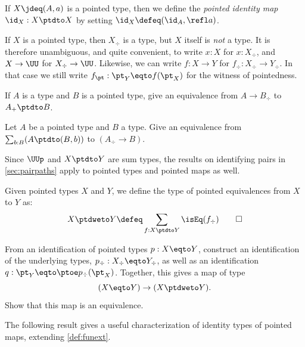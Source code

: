 \begin{definition}\label{def:pointedidentity}
  If $X \jdeq (A,a)$ is a pointed type, then we define the \emph{pointed identity map}
  $\id_X : X \ptdto X$ by setting $\id_X \defeq (\id_A, \refl a)$.
\end{definition}

\begin{remark}\label{rem:coerceawaypt}
If $X$ is a pointed type, then $X_\div $ is a type, but $X$ itself is
\emph{not} a type. It is therefore unambiguous, and quite convenient,
to write $x:X$ for $x:X_\div$, and $X\to\UU$ for $X_\div\to\UU$.
Likewise, we can write $f : X \to Y$ for $f_\div : X_\div \to Y_\div$.
In that case we still write $f_\pt : \pt_Y \eqto f(\pt_X)$ for the
witness of pointedness.
\end{remark}

\begin{xca}\label{xca:plusforgetadjoint}
If $A$ is a type and $B$ is a pointed type,
give an equivalence from $A\to B_\div$ to $A_+\ptdto B$.
\end{xca}

\begin{xca}\label{xca:freemaps}
  Let $A$ be a pointed type and $B$ a type. Give an equivalence from
  $\sum_{b:B}(A\ptdto (B,b))$ to $(A_\div\to B)$.
\end{xca}

Since $\UUp$ and $X\ptdto Y$ are sum types, the results on identifying pairs
in \cref{sec:pairpaths} apply to pointed types and pointed maps as well.

\begin{definition}\label{def:pointedequiv}
Given pointed types $X$ and $Y$, we define the type of pointed
equivalences from $X$ to $Y$ as:
  \[
    X \ptdweto Y \defeq \sum_{f : X \ptdto Y}\isEq(f_\div)\qedhere
  \]
\end{definition}
\begin{xca}\label{xca:pointedequiv}
  From an identification of pointed types $p : X \eqto Y$,
  construct an identification of the underlying types, $p_\div : X_\div \eqto Y_\div$,
  as well as an identification $q : \pt_Y \eqto \ptoe p_\div(\pt_X)$.
  Together, this gives a map of type
  \[
    (X \eqto Y) \to (X \ptdweto Y).
  \]
  Show that this map is an equivalence.
\end{xca}

The following result gives a useful characterization of 
identity types of pointed maps, extending \cref{def:funext}.

